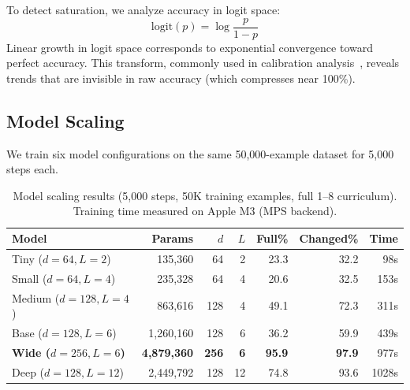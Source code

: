 \documentclass[11pt,a4paper]{article}
\begin{document}
To detect saturation, we analyze accuracy in logit space:
\begin{equation}
  \mathrm{logit}(p) = \log\frac{p}{1 - p}
\end{equation}
Linear growth in logit space corresponds to exponential convergence toward perfect accuracy.
This transform, commonly used in calibration analysis~\cite{guo2017calibration}, reveals trends that are invisible in raw accuracy (which compresses near 100\%).

\subsection{Model Scaling}

We train six model configurations on the same 50{,}000-example dataset for 5{,}000 steps each.

\begin{table}[h]
\centering
\caption{Model scaling results (5{,}000 steps, 50K training examples, full 1--8 curriculum). Training time measured on Apple M3 (MPS backend).}
\label{tab:model_scaling}
\begin{tabular}{lrrrrrr}
\toprule
\textbf{Model} & \textbf{Params} & $d$ & $L$ & \textbf{Full\%} & \textbf{Changed\%} & \textbf{Time} \\
\midrule
Tiny ($d{=}64, L{=}2$) & 135{,}360 & 64 & 2 & 23.3 & 32.2 & 98s \\
Small ($d{=}64, L{=}4$) & 235{,}328 & 64 & 4 & 20.6 & 32.5 & 153s \\
Medium ($d{=}128, L{=}4$) & 863{,}616 & 128 & 4 & 49.1 & 72.3 & 311s \\
Base ($d{=}128, L{=}6$) & 1{,}260{,}160 & 128 & 6 & 36.2 & 59.9 & 439s \\
\textbf{Wide ($d{=}256, L{=}6$)} & \textbf{4{,}879{,}360} & \textbf{256} & \textbf{6} & \textbf{95.9} & \textbf{97.9} & 977s \\
Deep ($d{=}128, L{=}12$) & 2{,}449{,}792 & 128 & 12 & 74.8 & 93.6 & 1028s \\
\bottomrule
\end{tabular}
\end{table}
\end{document}
